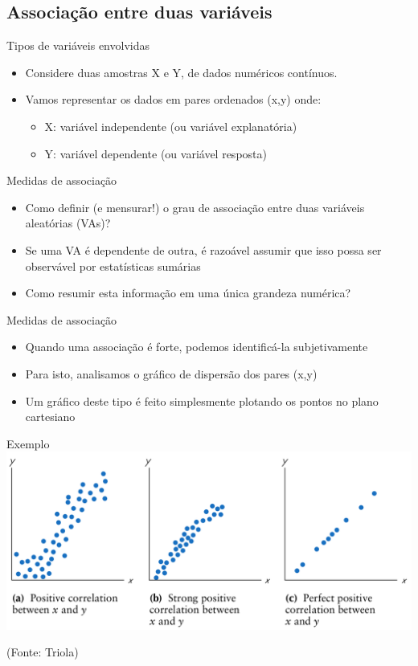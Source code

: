\documentclass{beamer}
\begin{document}
\subsection[Associação]{Associação entre duas variáveis}

\begin{frame}{Tipos de variáveis envolvidas}
  \begin{itemize}
  \item Considere duas amostras X e Y, de dados numéricos contínuos.
  \item Vamos representar os dados em pares ordenados (x,y) onde:
    \begin{itemize}
    \item X: variável independente (ou variável explanatória)
    \item Y: variável dependente (ou variável resposta)
    \end{itemize}
  \end{itemize}
\end{frame}

\begin{frame}{Medidas de associação}
  \begin{itemize}
  \item Como definir (e mensurar!) o grau de associação entre duas
    variáveis aleatórias (VAs)?
  \item Se uma VA é dependente de outra, é razoável assumir que isso
    possa ser observável por estatísticas sumárias
  \item Como resumir esta informação em uma única grandeza numérica?
  \end{itemize}
\end{frame}

\begin{frame}{Medidas de associação}
  \begin{itemize}
  \item Quando uma associação é forte, podemos identificá-la
    subjetivamente
  \item Para isto, analisamos o gráfico de dispersão dos pares (x,y)
  \item Um gráfico deste tipo é feito simplesmente plotando os pontos
    no plano cartesiano
  \end{itemize}
\end{frame}

\begin{frame}{Exemplo}
  \includegraphics[height=0.6\textheight]{positive}

  (Fonte: Triola)
\end{frame}
\end{document}
